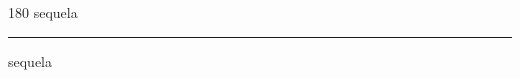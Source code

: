 
\begin{frame}
\begin{center}
\begin{turn}{180}
{\fontsize{2.5cm}{1em}\selectfont sequela}
\end{turn}
\vspace{1em}\par  
\hrule
\vspace{1em}\par  
{\fontsize{2.5cm}{1em}\selectfont sequela}
\end{center}
\end{frame}
